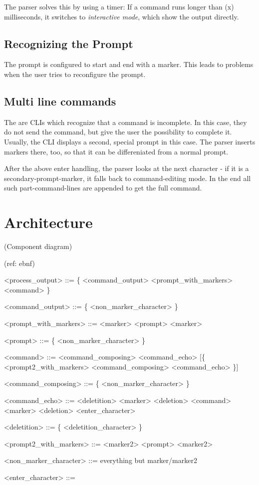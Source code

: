 \documentclass[twoside]{scrreprt}
\begin{document}
The parser solves this by using a timer: If a command runs longer than (x) milliseconds, it switches to \emph{interactive mode}, which show the output directly.

\subsection{Recognizing the Prompt}

The prompt is configured to start and end with a marker. This leads to problems when the user tries to reconfigure the prompt.

\subsection{Multi line commands}

The are CLIs which recognize that a command is incomplete. In this case, they do not send the command, but give the user the possibility to complete it. Usually, the CLI displays a second, special prompt in this case. The parser inserts markers there, too, so that it can be differeniated from a normal prompt.

After the above enter handling, the parser looks at the next character - if it is a secondary-prompt-marker, it falls back to command-editing mode. In the end all such part-command-lines are appended to get the full command.

\section{Architecture}

(Component diagram)

(ref: ebnf)


\begin{grammar}
<process_output> ::= \{ <command_output> <prompt_with_markers> <command> \}

<command_output> ::= \{ <non_marker_character> \}

<prompt_with_markers> ::= <marker> <prompt> <marker>

<prompt> ::= \{ <non_marker_character> \}

<command> ::= <command_composing> <command_echo> [\{ <prompt2_with_markers>  <command_composing>  <command_echo> \}]

<command_composing> ::= \{ <non_marker_character> \}

<command_echo> ::= <deletition> <marker> <deletion>  <command>  <marker>  <deletion>  <enter_character>

<deletition> ::= \{ <deletition_character> \}

<prompt2_with_markers> ::= <marker2> <prompt> <marker2>

<non_marker_character> ::= everything but marker/marker2

<enter_character> ::= 
\end{grammar}
\end{document}
